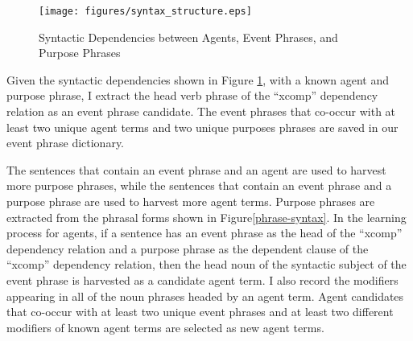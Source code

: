\begin{figure}[htbp]
 \centering
 \texttt{[image: figures/syntax\_structure.eps]}
 \caption{Syntactic Dependencies between Agents, Event Phrases, and Purpose Phrases}
\label{sentence-syntax}
\end{figure} 

Given the syntactic dependencies shown in Figure \ref{sentence-syntax}, 
with a known agent and purpose phrase, I extract 
the head verb phrase of the ``xcomp'' dependency relation as an
event phrase candidate. 
The event
phrases that co-occur with at least two unique agent terms and two unique
purposes phrases are saved in our event phrase dictionary.

The sentences that
contain an event phrase and an agent are used to harvest more
purpose phrases, while the sentences that contain an event phrase
and a purpose phrase are used to harvest more agent terms.
Purpose phrases are extracted from the
phrasal forms shown in Figure\ref{phrase-syntax}. 
In the learning process for agents, if a sentence has an event
phrase as the head of the ``xcomp'' dependency relation and a purpose
phrase as the dependent clause of the ``xcomp'' dependency relation,
then the head noun of the syntactic subject of the event phrase is harvested as a
candidate agent term.  I also record the modifiers appearing in all
of the noun phrases headed by an agent term. 
Agent candidates that co-occur with at
least two unique event phrases and at least two different
modifiers of known agent terms are selected as new agent terms. 

